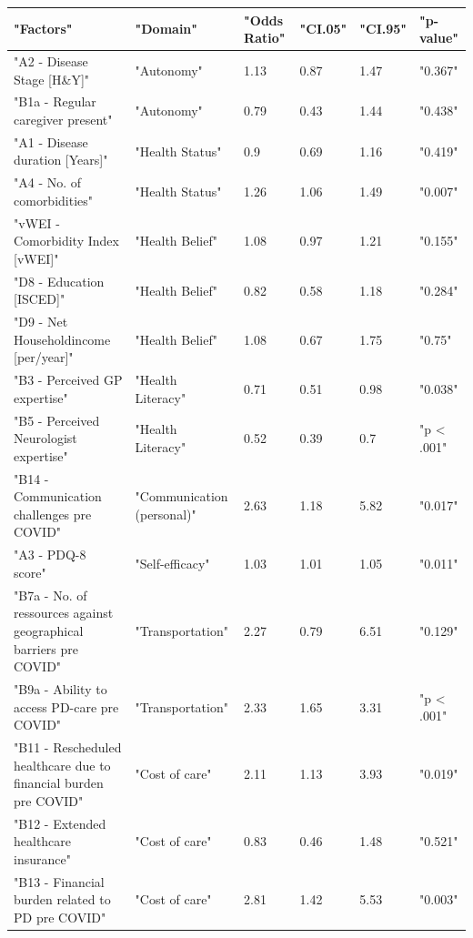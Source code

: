 \documentclass{bmcart}
\begin{document}
\begin{backmatter}
\begin{table}[!ht]
    \centering
    \begin{tabular}{|l|l|l|l|l|l|}
    \hline
        "Factors" & "Domain" & "Odds Ratio" & "CI.05" & "CI.95" & "p-value" \\ \hline
        "A2 - Disease Stage [H\&Y]" & "Autonomy" & 1.13 & 0.87 & 1.47 & "0.367" \\ \hline
        "B1a - Regular caregiver present" & "Autonomy" & 0.79 & 0.43 & 1.44 & "0.438" \\ \hline
        "A1 - Disease duration [Years]" & "Health Status" & 0.9 & 0.69 & 1.16 & "0.419" \\ \hline
        "A4 - No. of comorbidities" & "Health Status" & 1.26 & 1.06 & 1.49 & "0.007" \\ \hline
        "vWEI - Comorbidity Index [vWEI]" & "Health Belief" & 1.08 & 0.97 & 1.21 & "0.155" \\ \hline
        "D8 - Education [ISCED]" & "Health Belief" & 0.82 & 0.58 & 1.18 & "0.284" \\ \hline
        "D9 - Net Householdincome [per/year]" & "Health Belief" & 1.08 & 0.67 & 1.75 & "0.75" \\ \hline
        "B3 - Perceived GP expertise" & "Health Literacy" & 0.71 & 0.51 & 0.98 & "0.038" \\ \hline
        "B5 - Perceived Neurologist expertise" & "Health Literacy" & 0.52 & 0.39 & 0.7 & "p < .001" \\ \hline
        "B14 - Communication challenges pre COVID" & "Communication (personal)" & 2.63 & 1.18 & 5.82 & "0.017" \\ \hline
        "A3 - PDQ-8 score" & "Self-efficacy" & 1.03 & 1.01 & 1.05 & "0.011" \\ \hline
        "B7a - No. of ressources against geographical barriers pre COVID" & "Transportation" & 2.27 & 0.79 & 6.51 & "0.129" \\ \hline
        "B9a - Ability to access PD-care pre COVID" & "Transportation" & 2.33 & 1.65 & 3.31 & "p < .001" \\ \hline
        "B11 - Rescheduled healthcare due to financial burden pre COVID" & "Cost of care" & 2.11 & 1.13 & 3.93 & "0.019" \\ \hline
        "B12 - Extended healthcare insurance" & "Cost of care" & 0.83 & 0.46 & 1.48 & "0.521" \\ \hline
        "B13 - Financial burden related to PD pre COVID" & "Cost of care" & 2.81 & 1.42 & 5.53 & "0.003" \\ \hline

\end{tabular}
\end{table}
\end{backmatter}
\end{document}
